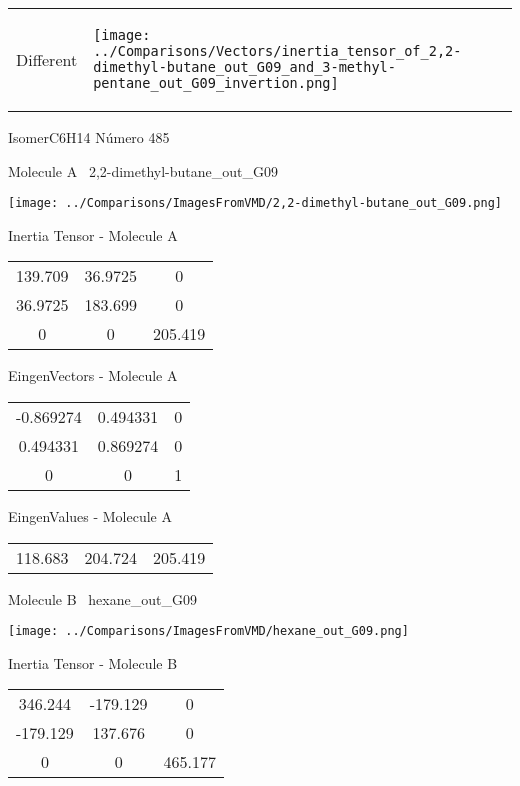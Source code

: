 \vtab[-5mm]
\begin{tabular}{*{2}{m{}}}
\begin{center}
\textcolor{NavyBlue}{\Large Different}
\end{center}
&
\begin{center}
\texttt{[image: ../Comparisons/Vectors/inertia\_tensor\_of\_2,2-dimethyl-butane\_out\_G09\_and\_3-methyl-pentane\_out\_G09\_invertion.png]}
\end{center}
\end{tabular}

 \newpage

\vtab[-3cm]
\begin{center}
{\large IsomerC6H14 \tab Número 485}
\end{center}
\begin{multicols}{2}
\begin{center}

Molecule A \
2,2-dimethyl-butane\_out\_G09

\texttt{[image: ../Comparisons/ImagesFromVMD/2,2-dimethyl-butane\_out\_G09.png]}

Inertia Tensor - Molecule A \\
\begin{tabular}{|c c c|}
139.709	 & 	36.9725	 & 	0	 \\
36.9725	 & 	183.699	 & 	0	 \\
0	 & 	0	 & 	205.419
\end{tabular}

\vtab
 EingenVectors - Molecule A     \\
\begin{tabular}{|c c c|}
-0.869274	 & 	0.494331	 & 	0	 \\
0.494331	 & 	0.869274	 & 	0	 \\
0	 & 	0	 & 	1
\end{tabular}

\vtab
 EingenValues - Molecule A     \\
\begin{tabular}{|c c c|}
118.683	 & 	204.724	 & 	205.419	 \\
\end{tabular}
\columnbreak

Molecule B \
hexane\_out\_G09

\texttt{[image: ../Comparisons/ImagesFromVMD/hexane\_out\_G09.png]}

Inertia Tensor - Molecule B \\
\begin{tabular}{|c c c|}
346.244	 & 	-179.129	 & 	0	 \\
-179.129	 & 	137.676	 & 	0	 \\
0	 & 	0	 & 	465.177
\end{tabular}


\end{center}
\end{multicols}
